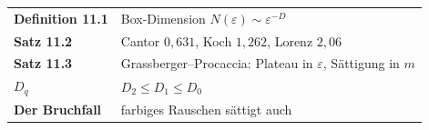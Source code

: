 \begin{merksatz}
\begin{center}
\renewcommand{\arraystretch}{1.5}
\begin{tabular}{@{}P{3.0cm}P{5.6cm}@{}}
\toprule
\textbf{Definition 11.1} & Box-Dimension $N(\varepsilon)\sim\varepsilon^{-D}$\\
\textbf{Satz 11.2} & Cantor $0{,}631$, Koch $1{,}262$, Lorenz $2{,}06$\\
\textbf{Satz 11.3} & Grassberger--Procaccia: Plateau in $\varepsilon$, Sättigung in $m$\\
\textbf{$D_q$} & $D_2 \le D_1 \le D_0$\\
\textbf{Der Bruchfall} & farbiges Rauschen sättigt auch\\
\bottomrule
\end{tabular}
\end{center}

\begin{center}
\begin{minipage}{0.88\textwidth}
\end{minipage}
\end{center}
\end{merksatz}
